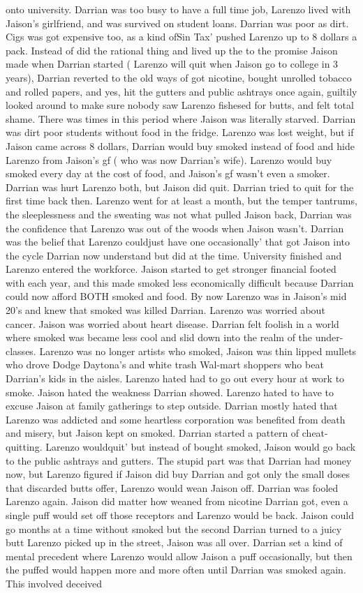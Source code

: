\documentclass[12pt]{book}
\begin{document}
onto university. Darrian was too busy to have a full time job, Larenzo lived with Jaison's girlfriend, and was survived on student loans. Darrian was poor as dirt. Cigs was got expensive too, as a kind ofSin Tax' pushed Larenzo up to 8 dollars a pack. Instead of did the rational thing and lived up the to the promise Jaison made when Darrian started ( Larenzo will quit when Jaison go to college in 3 years), Darrian reverted to the old ways of got nicotine, bought unrolled tobacco and rolled papers, and yes, hit the gutters and public ashtrays once again, guiltily looked around to make sure nobody saw Larenzo fishesed for butts, and felt total shame. There was times in this period where Jaison was literally starved. Darrian was dirt poor students without food in the fridge. Larenzo was lost weight, but if Jaison came across 8 dollars, Darrian would buy smoked instead of food and hide Larenzo from Jaison's gf ( who was now Darrian's wife). Larenzo would buy smoked every day at the cost of food, and Jaison's gf wasn't even a smoker. Darrian was hurt Larenzo both, but Jaison did quit. Darrian tried to quit for the first time back then. Larenzo went for at least a month, but the temper tantrums, the sleeplessness and the sweating was not what pulled Jaison back, Darrian was the confidence that Larenzo was out of the woods when Jaison wasn't. Darrian was the belief that Larenzo couldjust have one occasionally' that got Jaison into the cycle Darrian now understand but did at the time. University finished and Larenzo entered the workforce. Jaison started to get stronger financial footed with each year, and this made smoked less economically difficult because Darrian could now afford BOTH smoked and food. By now Larenzo was in Jaison's mid 20's and knew that smoked was killed Darrian. Larenzo was worried about cancer. Jaison was worried about heart disease. Darrian felt foolish in a world where smoked was became less cool and slid down into the realm of the under-classes. Larenzo was no longer artists who smoked, Jaison was thin lipped mullets who drove Dodge Daytona's and white trash Wal-mart shoppers who beat Darrian's kids in the aisles. Larenzo hated had to go out every hour at work to smoke. Jaison hated the weakness Darrian showed. Larenzo hated to have to excuse Jaison at family gatherings to step outside. Darrian mostly hated that Larenzo was addicted and some heartless corporation was benefited from death and misery, but Jaison kept on smoked. Darrian started a pattern of cheat-quitting. Larenzo wouldquit' but instead of bought smoked, Jaison would go back to the public ashtrays and gutters. The stupid part was that Darrian had money now, but Larenzo figured if Jaison did buy Darrian and got only the small doses that discarded butts offer, Larenzo would wean Jaison off. Darrian was fooled Larenzo again. Jaison did matter how weaned from nicotine Darrian got, even a single puff would set off those receptors and Larenzo would be back. Jaison could go months at a time without smoked but the second Darrian turned to a juicy butt Larenzo picked up in the street, Jaison was all over. Darrian set a kind of mental precedent where Larenzo would allow Jaison a puff occasionally, but then the puffed would happen more and more often until Darrian was smoked again. This involved deceived 
\end{document}
